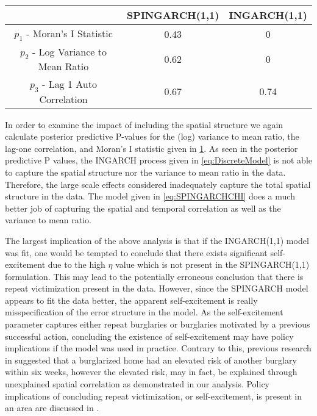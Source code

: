 \documentclass[11pt]{isuthesis}
\begin{document}
\begin{table}[!htp]
	 \label{Table:Pvals} 
	\begin{center}
		\begin{tabular}{ |c|c|c| } 
			\hline
			& SPINGARCH(1,1) & INGARCH(1,1)\\
			\hline 
			$p_1$ - Moran's I Statistic& 0.43 & 0 \\
			$p_2$ - Log Variance to Mean Ratio & 0.62 & 0\\
			$p_3$ - Lag 1 Auto Correlation & 0.67 & 0.74 \\ 
			\hline
		\end{tabular}
	\end{center}
\end{table}
In order to examine the impact of including the spatial structure we again calculate posterior predictive P-values for the (log) variance to mean ratio, the lag-one correlation, and Moran's I statistic given in \ref{Table:Pvals}.  As seen in the posterior predictive P values, the INGARCH process given in \eqref{eq:DiscreteModel} is not able to capture the spatial structure nor the variance to mean ratio in the data.  Therefore, the large scale effects considered inadequately capture the total spatial structure in the data. The model given in \eqref{eq:SPINGARCHCHI} does a much better job of capturing the spatial and temporal correlation as well as the variance to mean ratio. 

The largest implication of the above analysis is that if the INGARCH(1,1) model was fit, one would be tempted to conclude that there exists significant self-excitement due to the high $\eta$ value which is not present in the SPINGARCH(1,1) formulation.  This may lead to the potentially erroneous conclusion that there is repeat victimization present in the data.   However, since the SPINGARCH model appears to fit the data better, the apparent self-excitement is really misspecification of the error structure in the model.  As the self-excitement parameter captures either repeat burglaries or burglaries motivated by a previous successful action, concluding the existence of self-excitement may have policy implications if the model was used in practice.  Contrary to this, previous research in \cite{polvi1991time} suggested that a burglarized home had an elevated risk of another burglary within six weeks, however the elevated risk, may in fact, be explained through unexplained spatial correlation as demonstrated in our analysis.  Policy implications of concluding repeat victimization, or self-excitement, is present in an area are discussed in \cite{pease1998repeat}.  
\end{document}
